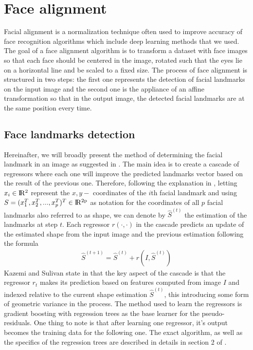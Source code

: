 \section{Face alignment}
Facial alignment is a normalization technique often used to improve accuracy of face recognition algorithms which include deep learning methods that we used. The goal of a face alignment algorithm is to transform a dataset with face images so that each face should be centered in the image, rotated such that the eyes lie on a horizontal line and be scaled to a fixed size.
The process of face alignment is structured in two steps: the first one represents the detection of facial landmarks on the input image and the second one is the appliance of an affine transformation so that in the output image, the detected facial landmarks are at the same position every time.
\subsection{Face landmarks detection}
Hereinafter, we will broadly present the method of determining the facial landmark in an image as suggested in \cite{kazemi2014one}. The main idea is to create a cascade of regressors where each one will improve the predicted landmarks vector based on the result of the previous one. Therefore, following the explanation in \cite{kazemi2014one}, letting $x_{i} \in \rm I\!R^{2}$ represent the $x,y - $ coordinates of the $i$th facial landmark and using $S = (x_{1}^{T}, x_{2}^{T}, ..., x_{p}^{T})^{T} \in \rm I\!R^{2p}$ as notation for the coordinates of all $p$ facial landmarks also referred to as shape, we can denote by $\hat{S}^{(t)}$ the estimation of the landmarks at step $t$. Each regressor $r(\cdot, \cdot)$ in the cascade predicts an update of the estimated shape from the input image and the previous estimation following the formula 
\begin{align}
	\hat{S}^{(t+1)} = \hat{S}^{(t)} + r(I, \hat{S}^{(t)})
\end{align}
Kazemi and Sulivan state in \cite{kazemi2014one} that the key aspect of the cascade is that the regressor $r_{t}$ makes its prediction based on features computed from image $I$ and indexed relative to the current shape estimation $\hat{S}^{(t)}$, this introducing some form of geometric variance in the process. The method used to learn the regressors is gradient boosting with regression trees as the base learner for the pseudo-residuals. One thing to note is that after learning one regressor, it's output becomes the training data for the following one. The exact algorithm, as well as the specifics of the regression trees are described in details in section 2 of \cite{kazemi2014one}.

